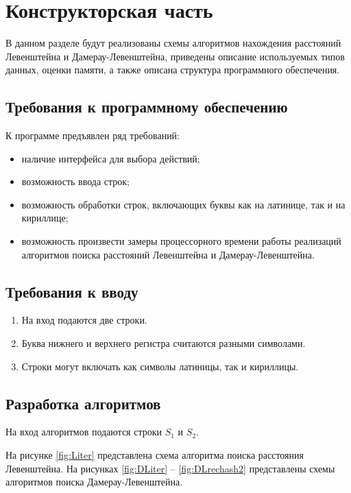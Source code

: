 \chapter{Конструкторская часть}

В данном разделе будут реализованы схемы алгоритмов нахождения расстояний Левенштейна и Дамерау-Левенштейна, приведены описание используемых типов данных, оценки памяти, а также описана структура программного обеспечения.

\section{Требования к программному обеспечению}\label{section:requirements}
К программе предъявлен ряд требований:
\begin{itemize}[label=---]
	\item наличие интерфейса для выбора действий;
	\item возможность ввода строк;
	\item возможность обработки строк, включающих буквы как на латинице, так и на кириллице;
	\item возможность произвести замеры процессорного времени работы реализаций алгоритмов поиска расстояний Левенштейна и Дамерау-Левенштейна.
\end{itemize}

\section{Требования к вводу}\label{section:requirements}
\begin{enumerate}
    \item На вход подаются две строки.
    \item Буква нижнего и верхнего регистра считаются разными символами.
    \item Строки могут включать как символы латиницы, так и кириллицы.
\end{enumerate}

\section{Разработка алгоритмов}

На вход алгоритмов подаются строки $S_1$ и $S_2$.

На рисунке \ref{fig:Liter} представлена схема алгоритма поиска расстояния Левенштейна.
На рисунках \ref{fig:DLiter} -- \ref{fig:DLrechash2} представлены схемы алгоритмов поиска Дамерау-Левенштейна.

